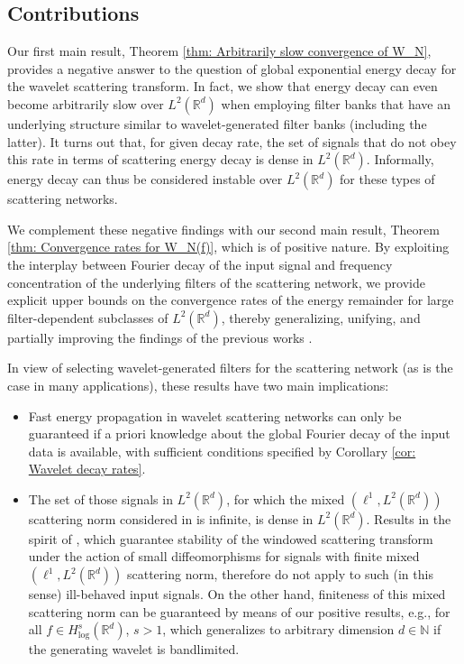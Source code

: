 \documentclass[11pt]{amsart}
\newcommand{\R}{{\mathbb{R}}}
\newcommand{\N}{\mathbb{N}}
\newenvironment{proof sketch} {\textit{Proof sketch.}}{}
\begin{document}
  \subsection{Contributions}
  
  Our first main result, Theorem \ref{thm: Arbitrarily slow convergence of W_N}, provides a negative answer to the question of global exponential energy decay for the wavelet scattering transform. In fact, we show that energy decay can even become arbitrarily slow over $L^2(\R^d)$ when employing filter banks that have an underlying structure similar to wavelet-generated filter banks (including the latter). It turns out that, for given decay rate, the set of signals that do not obey this rate in terms of scattering energy decay is dense in $L^2(\R^d)$. Informally, energy decay can thus be considered instable over $L^2(\R^d)$ for these types of scattering networks. 
  
  We complement these negative findings with our second main result, Theorem \ref{thm: Convergence rates for W_N(f)}, which is of positive nature. By exploiting the interplay between Fourier decay of the input signal and frequency concentration of the underlying filters of the scattering network, we provide explicit upper bounds on the convergence rates of the energy remainder for large filter-dependent subclasses of $L^2(\R^d)$, thereby generalizing, unifying, and partially improving the findings of the previous works \cite{czaja2019analysis,waldspurger2017exponential,wiatowski2017energy,wiatowski2017topology}.
  
  In view of selecting wavelet-generated filters for the scattering network (as is the case in many applications), these results have two main implications:
  \begin{itemize}
    \item Fast energy propagation in wavelet scattering networks can only be guaranteed if a priori knowledge about the global Fourier decay of the input data is available, with sufficient conditions specified by Corollary \ref{cor: Wavelet decay rates}.
    \item The set of those signals in $L^2(\R^d)$, for which the mixed $(\ell^1,L^2(\R^d))$ scattering norm considered in \cite[Section 2.5]{mallat2012group} is infinite, is dense in $L^2(\R^d)$. Results in the spirit of \cite[Theorem 2.12]{mallat2012group}, which guarantee stability of the windowed scattering transform under the action of small diffeomorphisms for signals with finite mixed $(\ell^1,L^2(\R^d))$ scattering norm, therefore do not apply to such (in this sense) ill-behaved input signals. On the other hand, finiteness of this mixed scattering norm can be guaranteed by means of our positive results, e.g., for all $f \in H^s_{\log}(\R^d)$, $s>1$, which generalizes \cite[Proposition 2.4]{nicola2023stability} to arbitrary dimension $d \in \N$ if the generating wavelet is bandlimited.
  \end{itemize}
  
\end{document}
